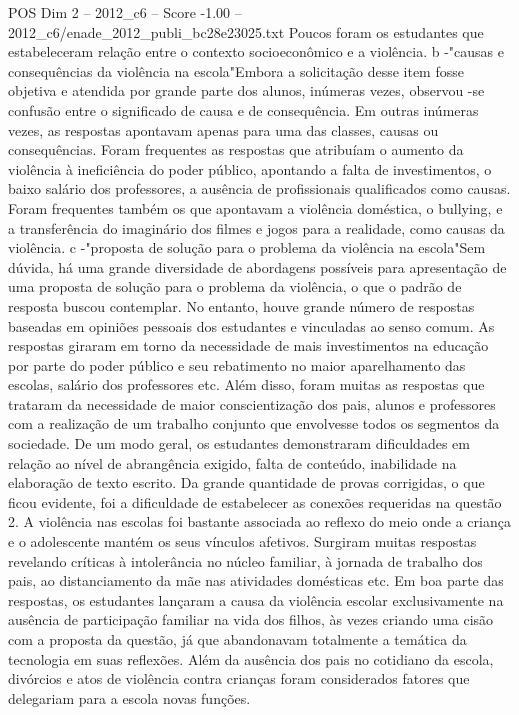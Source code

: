 \begin{textsample}{POS Dim 2 – 2012\_c6 – Score -1.00 – 2012\_c6/enade\_2012\_publi\_bc28e23025.txt}
Poucos foram os estudantes que estabeleceram relação entre o contexto socioeconômico e a violência. b -"causas e consequências da violência na escola"Embora a solicitação desse item fosse objetiva e atendida por grande parte dos alunos, inúmeras vezes, observou -se confusão entre o significado de causa e de consequência.
Em outras inúmeras vezes, as respostas apontavam apenas para uma das classes, causas ou consequências.
Foram frequentes as respostas que atribuíam o aumento da violência à ineficiência do poder público, apontando a falta de investimentos, o baixo salário dos professores, a ausência de profissionais qualificados como causas.
Foram frequentes também os que apontavam a violência doméstica, o bullying, e a transferência do imaginário dos filmes e jogos para a realidade, como causas da violência. c -"proposta de solução para o problema da violência na escola"Sem dúvida, há uma grande diversidade de abordagens possíveis para apresentação de uma proposta de solução para o problema da violência, o que o padrão de resposta buscou contemplar.
No entanto, houve grande número de respostas baseadas em opiniões pessoais dos estudantes e vinculadas ao senso comum.
As respostas giraram em torno da necessidade de mais investimentos na educação por parte do poder público e seu rebatimento no maior aparelhamento das escolas, salário dos professores etc.
Além disso, foram muitas as respostas que trataram da necessidade de maior conscientização dos pais, alunos e professores com a realização de um trabalho conjunto que envolvesse todos os segmentos da sociedade.
De um modo geral, os estudantes demonstraram dificuldades em relação ao nível de abrangência exigido, falta de conteúdo, inabilidade na elaboração de texto escrito.
Da grande quantidade de provas corrigidas, o que ficou evidente, foi a dificuldade de estabelecer as conexões requeridas na questão 2.
A violência nas escolas foi bastante associada ao reflexo do meio onde a criança e o adolescente mantém os seus vínculos afetivos.
Surgiram muitas respostas revelando críticas à intolerância no núcleo familiar, à jornada de trabalho dos pais, ao distanciamento da mãe nas atividades domésticas etc.
Em boa parte das respostas, os estudantes lançaram a causa da violência escolar exclusivamente na ausência de participação familiar na vida dos filhos, às vezes criando uma cisão com a proposta da questão, já que abandonavam totalmente a temática da tecnologia em suas reflexões.
Além da ausência dos pais no cotidiano da escola, divórcios e atos de violência contra crianças foram considerados fatores que delegariam para a escola novas funções.

\end{textsample}
